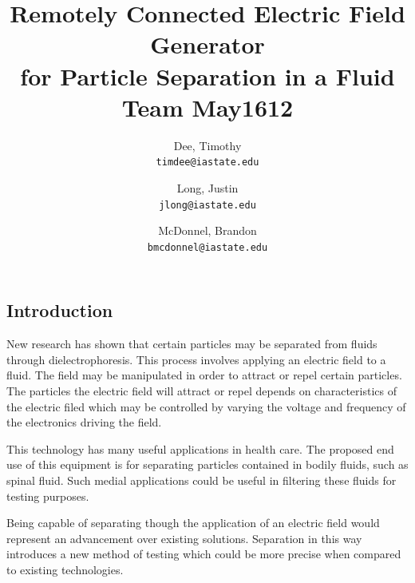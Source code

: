 \documentclass{article}	%
\author{Dee, Timothy\\
    \texttt{timdee@iastate.edu}
    \and
    Long, Justin\\
    \texttt{jlong@iastate.edu}
    \and
    McDonnel, Brandon\\
    \texttt{bmcdonnel@iastate.edu}
}
\title{Remotely Connected Electric Field Generator\\
for Particle Separation in a Fluid \\
\large{Team May1612}}
\newenvironment{vplace}[1][1]
  {\par\vspace*{\stretch{#1}}}
  {\vspace*{\stretch{1}}\par}
\begin{document}
\thispagestyle{empty}
\maketitle

\newpage
\tableofcontents
\newpage

\begin{multicols}{2}


\section{Introduction}
New research has shown that certain particles may be separated from fluids through dielectrophoresis.
This process involves applying an electric field to a fluid.
The field may be manipulated in order to attract or repel certain particles.
The particles the electric field will attract or repel depends on
characteristics of the electric filed which may be controlled
by varying the voltage and frequency of the electronics driving the field.

This technology has many useful applications in health care.
The proposed end use of this equipment is
for separating particles contained in bodily fluids,
such as spinal fluid.
Such medial applications could be useful
in filtering these fluids for testing purposes.

Being capable of separating though the
application of an electric field would represent
an advancement over existing solutions.
Separation in this way introduces a new method of testing which
could be more precise when compared
to existing technologies.


\end{multicols}
\end{document}
